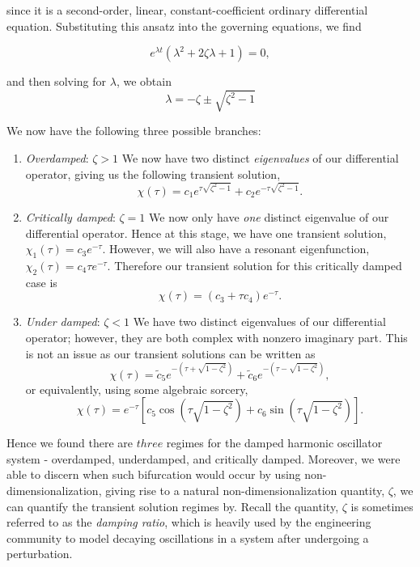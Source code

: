 since it is a second-order, linear, constant-coefficient ordinary differential equation. Substituting this ansatz into the governing equations, we find

$$e^{\lambda t} ( \lambda^2 + 2\zeta \lambda + 1 ) = 0,$$

and then solving for $\lambda$, we obtain 
\begin{equation}
\label{spring_lambda} \lambda = -\zeta \pm \sqrt{\zeta^2 - 1} 
\end{equation}

We now have the following three possible branches:
\begin{enumerate}
%
\item \emph{Overdamped}: $\zeta > 1$
We now have two distinct \emph{eigenvalues} of our differential operator, giving us the following transient solution, $$\chi(\tau) = c_1 e^{\tau \sqrt{\zeta^2 - 1} } + c_2 e^{- \tau \sqrt{\zeta^2 - 1} }.$$
%
\item \emph{Critically damped}: $\zeta = 1$
We now only have \emph{one} distinct eigenvalue of our differential operator. Hence at this stage, we have one transient solution, $\chi_1(\tau) = c_3 e^{-\tau}$. However, we will also have a resonant eigenfunction, $\chi_2(\tau) = c_4 \tau e^{-\tau}.$ Therefore our transient solution for this critically damped case is $$\chi(\tau) = (c_3 + \tau c_4) e^{-\tau}.$$
%
\item \emph{Under damped}: $\zeta < 1$
We have two distinct eigenvalues of our differential operator; however, they are both complex with nonzero imaginary part. This is not an issue as our transient solutions can be written as $$\chi(\tau) = \tilde{c}_5 e^{-(\tau+\sqrt{1-\zeta^2})} + \tilde{c}_6 e^{-(\tau-\sqrt{1-\zeta^2})},$$
or equivalently, using some algebraic sorcery,
$$\chi(\tau) = e^{-\tau} \left[ c_5 \cos(\tau \sqrt{1-\zeta^2} ) + c_6 \sin(\tau \sqrt{1-\zeta^2}  ) \right].$$
\end{enumerate}

Hence we found there are $three$ regimes for the damped harmonic oscillator system - overdamped, underdamped, and critically damped. Moreover, we were able to discern when such bifurcation would occur by using non-dimensionalization, giving rise to a natural non-dimensionalization quantity, $\zeta$, we can quantify the transient solution regimes by. Recall the quantity, $\zeta$ is sometimes referred to as the \emph{damping ratio}, which is heavily used by the engineering community to model decaying oscillations in a system after undergoing a perturbation.     \\  







